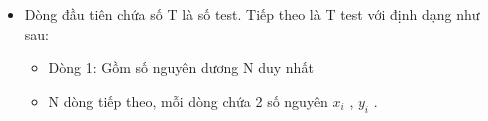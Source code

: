 \begin{itemize}
	\item Dòng đầu tiên chứa số T là số test. Tiếp theo là T test với định dạng như sau:
\begin{itemize}
	\item Dòng 1: Gồm số nguyên dương N duy nhất
	\item N dòng tiếp theo, mỗi dòng chứa 2 số nguyên $x_{i}$ , $y_{i}$ .
\end{itemize}
\end{itemize}
